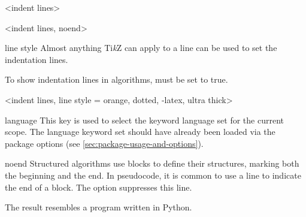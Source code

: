 \documentclass[a4paper, 11pt]{article}
\begin{document}
\begin{PDExample}
    \begin{algorithmic}<indent lines>
                \EndIf
            \EndFor
        \EndFor
    \end{algorithmic}

    \begin{algorithmic}<indent lines, noend>
                \EndIf
            \EndFor
        \EndFor
    \end{algorithmic}
\end{PDExample}

\begin{Optiondef}{line style}{}{}
    Almost anything Ti\emph{k}Z can apply to a line can be used to set the indentation lines.

    To show indentation lines in algorithms,  must be set to true.
\end{Optiondef}

\begin{PDExample}
    \begin{algorithmic}<indent lines, line style = {orange, dotted, -latex, ultra thick}>
                \EndIf
            \EndFor
        \EndFor
    \end{algorithmic}
\end{PDExample}


\begin{Optiondef}{language}{}{}
    This key is used to select the keyword language set for the current scope. The language keyword set should have already been loaded via the package options (see \cref{sec:package-usage-and-options}).
\end{Optiondef}

\begin{Optiondef}{noend}{}
    Structured algorithms use blocks to define their structures, marking both the beginning and the end. In pseudocode, it is common to use a line to indicate the end of a block. The  option suppresses this line.

    The result resembles a program written in Python.
\end{Optiondef}
\end{document}
